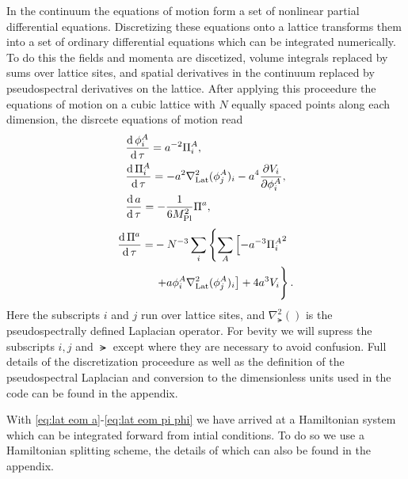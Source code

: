 In the continuum the equations of motion form a set of nonlinear partial differential equations. Discretizing these equations onto a lattice transforms them into a set of ordinary differential equations which can be integrated numerically. To do this the fields and momenta are discetized, volume integrals replaced by sums over lattice sites, and spatial derivatives in the continuum replaced by pseudospectral derivatives on the lattice. After applying this proceedure the equations of motion on a cubic lattice with $N$ equally spaced points along each dimension, the disrcete equations of motion read
\begin{align}
  & \frac{\mathrm{d}\,\phi^A_i}{\mathrm{d}\,\tau} = a^{-2}\Pi^A_i,  \label{eq:lat eom a}\\
  & \frac{\mathrm{d}\,\Pi^A_i}{\mathrm{d}\,\tau} = -a^2\nabla^2_{\mathrm{Lat}}(\phi^A_j)_i -a^4\frac{\partial V_i}{\partial \phi^A_i},  \label{eq:lat eom pi a}\\
  & \frac{\mathrm{d}\, a}{\mathrm{d}\,\tau} = -\frac{1}{6M_{\mathrm{Pl}}^2}\Pi^a,  \label{eq:lat eom phi}
\end{align}
\begin{align}
  \begin{split}
    \frac{\dd\Pi^a}{\dd\tau} = &-N^{-3}\sum_i\left\{
    \sum_A\left[-a^{-3}{\Pi^A_i}^2 \right.\right. \\
    &  \left.\left. + a\phi^A_i\nabla^2_\lat(\phi^A_j)_i \right]%
    + 4a^3V_i\vphantom{\sum_A}\right\}.
  \end{split} \label{eq:lat eom pi phi}  
\end{align}
Here the subscripts $i$ and $j$ run over lattice sites, and $\nabla^2_\lat()$ is the pseudospectrally defined Laplacian operator.
For bevity we will supress the subscripts $i,j$ and $\lat$ except where they are necessary to avoid confusion.
Full details of the discretization proceedure as well as the definition of the pseudospectral Laplacian and conversion to the dimensionless units used in the code can be found in the appendix.

With \eqref{eq:lat eom a}-\eqref{eq:lat eom pi phi} we have arrived at a Hamiltonian system which can be integrated forward from intial conditions. To do so we use a Hamiltonian splitting scheme, the details of which can also be found in the appendix.


